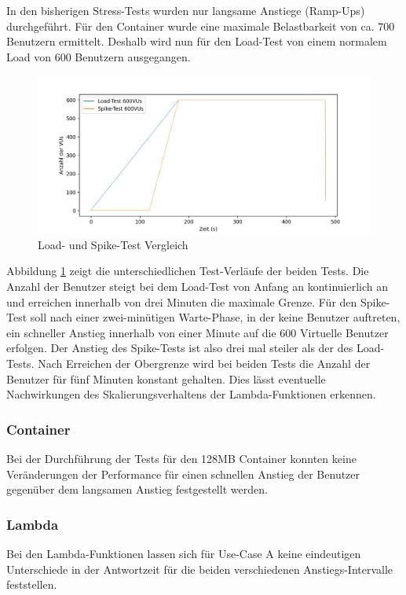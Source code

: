 In den bisherigen Stress-Tests wurden nur langsame Anstiege (Ramp-Ups) durchgeführt. Für den Container wurde eine maximale Belastbarkeit von ca. 700 Benutzern ermittelt. Deshalb wird nun für den Load-Test von einem normalem Load von 600 Benutzern ausgegangen. 

\begin{figure}[H]
    \includegraphics[width=\textwidth]{img/load600-vs-spike600.png}
    \caption[Load- und Spike-Test Vergleich]{Load- und Spike-Test Vergleich}
    \label{fig:load600-vs-spike600}
\end{figure}

Abbildung \ref{fig:load600-vs-spike600} zeigt die unterschiedlichen Test-Verläufe der beiden Tests. Die Anzahl der Benutzer steigt bei dem Load-Test von Anfang an kontinuierlich an und erreichen innerhalb von drei Minuten die maximale Grenze. Für den Spike-Test soll nach einer zwei-minütigen Warte-Phase, in der keine Benutzer auftreten, ein schneller Anstieg innerhalb von einer Minute auf die 600 Virtuelle Benutzer erfolgen. Der Anstieg des Spike-Tests ist also drei mal steiler als der des Load-Tests. 
Nach Erreichen der Obergrenze wird bei beiden Tests die Anzahl der Benutzer für fünf Minuten konstant gehalten. Dies lässt eventuelle Nachwirkungen des Skalierungsverhaltens der Lambda-Funktionen erkennen.


\subsubsection{Container}
Bei der Durchführung der Tests für den 128MB Container konnten keine Veränderungen der Performance für einen schnellen Anstieg der Benutzer gegenüber dem langsamen Anstieg festgestellt werden.

\subsubsection{Lambda}
Bei den Lambda-Funktionen lassen sich für Use-Case A keine eindeutigen Unterschiede in der Antwortzeit für die beiden verschiedenen Anstiegs-Intervalle feststellen. 


